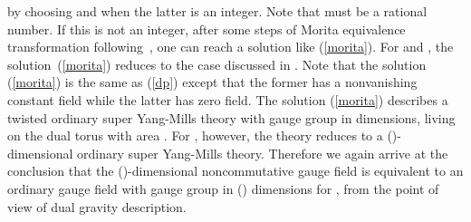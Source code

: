 \documentclass[a4paper,12pt]{article}
\begin{document}
by choosing \coordHE{} and \coordHE{} when the latter is
an integer. Note that \coordHE{} must be a rational number. If this is
not an integer, after some steps of Morita equivalence transformation
following~\cite{Hashimoto2}, one can reach a solution like (\ref{morita}).
For \coordHE{} and \coordHE{}, the solution~(\ref{morita}) reduces to the case
discussed in \cite{Douglas,Hashimoto2}. Note that the solution (\ref{morita})
is the same as (\ref{dp}) except that the former has a nonvanishing constant
\coordHE{} field while the latter has zero \coordHE{} field. The solution (\ref{morita})
describes a twisted ordinary super Yang-Mills theory with gauge group
\coordHE{} in \coordHE{} dimensions, living on the dual torus with area
\coordHE{}. For \coordHE{},
however, the theory reduces to a (\coordHE{})-dimensional ordinary super Yang-Mills
theory. Therefore we again arrive at the conclusion that the
(\coordHE{})-dimensional noncommutative gauge field is equivalent to an ordinary
gauge field with gauge group \coordHE{} in (\coordHE{}) dimensions for
\coordHE{}, from the point of view of dual gravity description.
\end{document}
